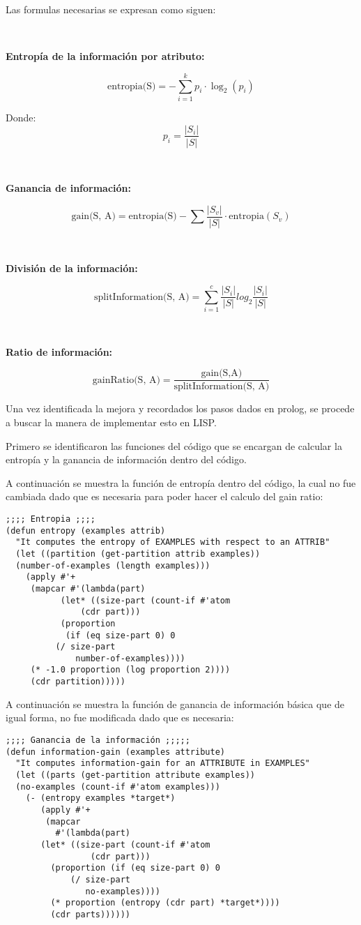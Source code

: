 \documentclass[11pt, letterpaper]{article}
\begin{document}
Las formulas necesarias se expresan como siguen: 

\

\textbf{Entropía de la información por atributo:}	 

$$\text{entropia(S)} = - \sum_{i=1}^{k} p_i \cdot \log_2(p_i)$$

Donde:
$$p_i = \frac{|S_i|}{|S|}$$

\

\textbf{Ganancia de información:}	 

$$\text{gain(S, A)} = \text{entropia(S)} - \sum{\frac{|S_v|}{|S|} \cdot \text{entropia}(S_v)} $$

\

\textbf{División de la información:}	 

$$\text{splitInformation(S, A)} = \sum_{i = 1}^{c} {\frac{|S_i|}{|S|} log_2 \frac{|S_i|}{|S|}}$$

\

\textbf{Ratio de información:}	 

$$\text{gainRatio(S, A)} = \frac{\text{gain(S,A)}}{\text{splitInformation(S, A)}}$$

Una vez identificada la mejora y recordados los pasos dados en prolog, se procede a buscar la manera de implementar esto en LISP.

Primero se identificaron las funciones del código que se encargan de calcular la entropía y la ganancia de información dentro del código.

A continuación se muestra la función de entropía dentro del código, la cual no fue cambiada dado que es necesaria para poder hacer el calculo del gain ratio:


\begin{verbatim}
;;;; Entropia ;;;;
(defun entropy (examples attrib)
  "It computes the entropy of EXAMPLES with respect to an ATTRIB"
  (let ((partition (get-partition attrib examples))
  (number-of-examples (length examples)))
    (apply #'+
     (mapcar #'(lambda(part)
           (let* ((size-part (count-if #'atom 
               (cdr part)))
           (proportion 
            (if (eq size-part 0) 0
          (/ size-part 
              number-of-examples))))
     (* -1.0 proportion (log proportion 2))))
     (cdr partition)))))	
\end{verbatim}

A continuación se muestra la función de ganancia de información básica que de igual forma, no fue modificada dado que es necesaria:

\begin{verbatim}
;;;; Ganancia de la información ;;;;;
(defun information-gain (examples attribute)
  "It computes information-gain for an ATTRIBUTE in EXAMPLES"
  (let ((parts (get-partition attribute examples))
  (no-examples (count-if #'atom examples)))
    (- (entropy examples *target*)
       (apply #'+
        (mapcar 
          #'(lambda(part)
       (let* ((size-part (count-if #'atom
                 (cdr part)))
         (proportion (if (eq size-part 0) 0
             (/ size-part
                no-examples))))
         (* proportion (entropy (cdr part) *target*))))
         (cdr parts))))))
\end{verbatim}
\end{document}
